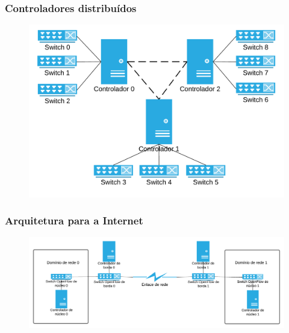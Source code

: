 %
%
\begin{frame}\frametitle{Controladores distribuídos}

	\begin{figure}[h]
        \centering
        \includegraphics[scale=.9]{images/distributed_sdn_controller}
    \end{figure}
\end{frame}


%
%
\begin{frame}\frametitle{Arquitetura para a Internet}

	\begin{figure}[h]
        \centering
        \includegraphics[scale=.6]{images/edge-core-sdn}
    \end{figure}
\end{frame}
